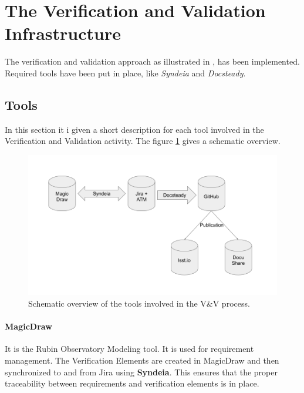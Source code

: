 
\section{The Verification and Validation Infrastructure}

The verification and validation approach as illustrated in \cite{10.1117/12.2310125} , has been implemented.
Required tools have been put in place, like \textit{Syndeia} and \textit{Docsteady}.


\subsection{Tools}

In this section it i given a short description for each tool involved in the Verification and Validation activity.
The figure \ref{fig:vandvtools} gives a schematic overview.

\begin{figure}
\begin{center}
\includegraphics[width=\textwidth]{imgs/VandVtools.png}
 \caption{Schematic overview of the tools involved in the V\&V process.}
 \label{fig:vandvtools}
\end{center}
\end{figure}

\paragraph{MagicDraw}
It is the Rubin Observatory Modeling tool. It is used for requirement management. The Verification Elements are created
in MagicDraw and then synchronized to and from Jira using \textbf{Syndeia}. This ensures that the proper 
traceability between requirements and verification elements is in place.

